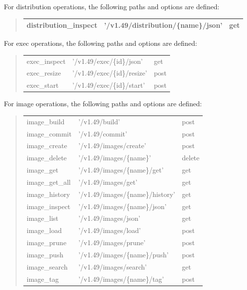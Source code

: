 \begin{description}
For distribution operations, the following paths and options are defined:

\begin{quote}
\begin{tabulary}{0.9\textwidth}{|l|L|l|}
\hline
distribution_inspect & '/v1.49/distribution/\{name\}/json' & get \\
\hline
\end{tabulary}
\end{quote}

For exec operations, the following paths and options are defined:

\begin{quote}
\begin{tabulary}{0.9\textwidth}{|l|L|l|}
\hline
exec_inspect & '/v1.49/exec/\{id\}/json' & get \\
exec_resize & '/v1.49/exec/\{id\}/resize' & post \\
exec_start & '/v1.49/exec/\{id\}/start' & post \\
\hline
\end{tabulary}
\end{quote}

For image operations, the following paths and options are defined:

\begin{quote}
\begin{tabulary}{0.9\textwidth}{|l|L|l|}
\hline
image_build & '/v1.49/build' & post \\
image_commit & '/v1.49/commit' & post \\
image_create & '/v1.49/images/create' & post \\
image_delete & '/v1.49/images/\{name\}' & delete \\
image_get & '/v1.49/images/\{name\}/get' & get \\
image_get_all & '/v1.49/images/get' & get \\
image_history & '/v1.49/images/\{name\}/history' & get \\
image_inspect & '/v1.49/images/\{name\}/json' & get \\
image_list & '/v1.49/images/json' & get \\
image_load & '/v1.49/images/load' & post \\
image_prune & '/v1.49/images/prune' & post \\
image_push & '/v1.49/images/\{name\}/push' & post \\
image_search & '/v1.49/images/search' & get \\
image_tag & '/v1.49/images/\{name\}/tag' & post \\
\hline
\end{tabulary}
\end{quote}


\end{description}
